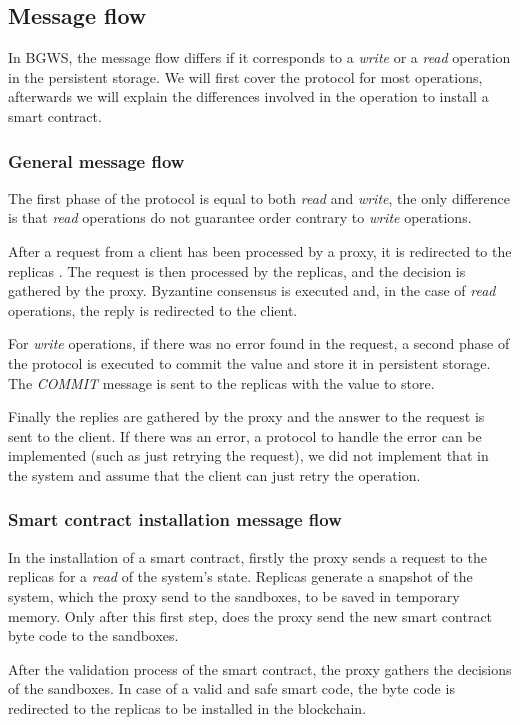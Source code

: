 \documentclass[10pt,journal,compsoc]{IEEEtran}
\begin{document}
	\subsection{Message flow} 
	In BGWS, the message flow differs if it corresponds to a \textit{write} or a \textit{read} operation in the persistent storage. We will first cover the protocol for most operations, afterwards we will explain the differences involved in the operation to install a smart contract.
	
	\subsubsection{General message flow} 
    The first phase of the protocol is equal to both \textit{read} and \textit{write}, the only difference is that \textit{read} operations do not guarantee order contrary to \textit{write} operations. 	
    
    After a request from a client has been processed by a proxy, it is redirected to the replicas . The request is then processed by the replicas, and the decision is gathered by the proxy. Byzantine consensus is executed and, in the case of \textit{read} operations, the reply is redirected to the client.
    
    For \textit{write} operations, if there was no error found in the request, a second phase of the protocol is executed to commit the value and store it in persistent storage. The \textit{COMMIT} message is sent to the replicas with the value to store. 
    
    Finally the replies are gathered by the proxy and the answer to the request is sent to the client. If there was an error, a protocol to handle the error can be implemented (such as just retrying the request), we did not implement that in the system and assume that the client can just retry the operation.
    
    \subsubsection{Smart contract installation message flow} 
    In the installation of a smart contract, firstly the proxy sends a request to the replicas for a \textit{read} of the system's state. Replicas generate a snapshot of the system, which the proxy send to the sandboxes, to be saved in temporary memory. Only after this first step, does the proxy send the new smart contract byte code to the sandboxes. 
    
    After the validation process of the smart contract, the proxy gathers the decisions of the sandboxes. In case of a valid and safe smart code, the byte code is redirected to the replicas to be installed in the blockchain. 
    
\end{document}
